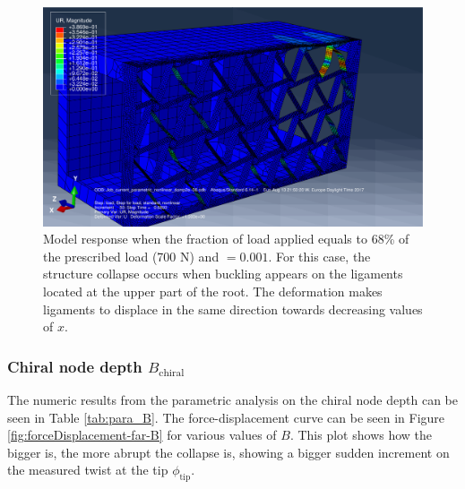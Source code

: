       \begin{figure}[!htpb] %
        \centering
        \includegraphics[width=0.8 \textwidth]{../figures/result-sim/eccen/0coma001_UR}
        \caption[Model response when the fraction of load applied equals to 68\% of the prescribed load (700 N) and \chie$= 0.001$]{Model response when the fraction of load applied equals to 68\% of the prescribed load (700 N) and \chie$= 0.001$. For this case, the structure collapse occurs when buckling appears on the ligaments located at the upper part of the root. The deformation makes ligaments to displace in the same direction towards decreasing values of $x$.}
        \label{fig:0coma001_UR}
      \end{figure}


    \clearpage
    \subsubsection{Chiral node depth $B_{\mathrm{chiral}}$}

      The numeric results from the parametric analysis on the chiral node depth \chiB can be seen in Table \ref{tab:para_B}. The force-displacement curve can be seen in Figure \ref{fig:forceDisplacement-far-B} for various values of $B$. This plot shows how the bigger \chiB is, the more abrupt the collapse is, showing a bigger sudden increment on the measured twist at the tip $\phi_{\mathrm{tip}}$.

